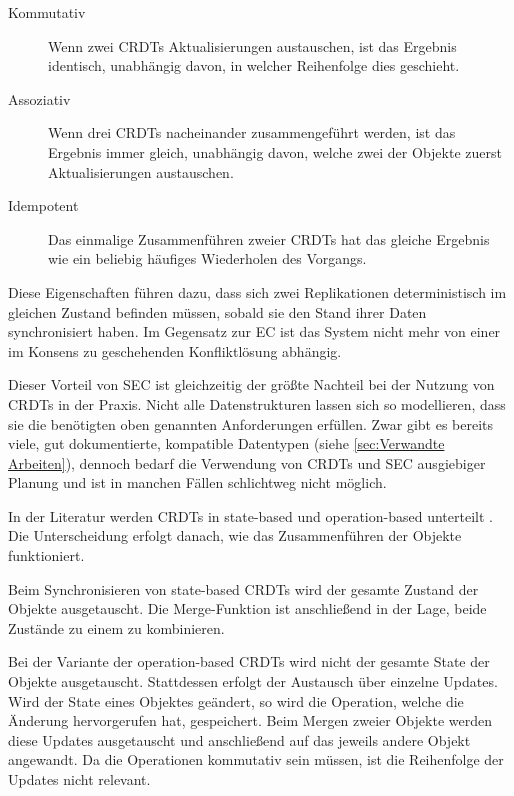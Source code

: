 \documentclass[a4paper, 12pt]{scrreprt}
\begin{document}
\begin{description}
	\item[Kommutativ] Wenn zwei CRDTs Aktualisierungen austauschen, ist das Ergebnis identisch, unabhängig davon, in welcher Reihenfolge dies geschieht.%
	\item[Assoziativ] Wenn drei CRDTs nacheinander zusammengeführt werden, ist das Ergebnis immer gleich, unabhängig davon, welche zwei der Objekte zuerst Aktualisierungen austauschen.%
	\item[Idempotent] Das einmalige Zusammenführen zweier CRDTs hat das gleiche Ergebnis wie ein beliebig häufiges Wiederholen des Vorgangs.%
\end{description}

Diese Eigenschaften führen dazu, dass sich zwei Replikationen deterministisch im gleichen Zustand befinden müssen, sobald sie den Stand ihrer Daten synchronisiert haben. Im Gegensatz zur \ac{EC} ist das System nicht mehr von einer im Konsens zu geschehenden Konfliktlösung abhängig. 

Dieser Vorteil von \ac{SEC} ist gleichzeitig der größte Nachteil bei der Nutzung von CRDTs in der Praxis. Nicht alle Datenstrukturen lassen sich so modellieren, dass sie die benötigten oben genannten Anforderungen erfüllen. Zwar gibt es bereits viele, gut dokumentierte, kompatible Datentypen (siehe \ref{sec:Verwandte Arbeiten}), dennoch bedarf die Verwendung von CRDTs und \ac{SEC} ausgiebiger Planung und ist in manchen Fällen schlichtweg nicht möglich.

In der Literatur werden CRDTs in state-based und operation-based unterteilt \autocite[S. 10]{ArticleOptimisticReplication}. Die Unterscheidung erfolgt danach, wie das Zusammenführen der Objekte funktioniert.

\begin{description}
\label{sec:stateopbased}
	\item[State-based]
	Beim Synchronisieren von state-based CRDTs wird der gesamte Zustand der Objekte ausgetauscht.
	Die Merge-Funktion ist anschließend in der Lage, beide Zustände zu einem zu kombinieren. 
	
	\item[Operation-based]
	Bei der Variante der operation-based CRDTs wird nicht der gesamte State der Objekte ausgetauscht. Stattdessen erfolgt der Austausch über einzelne Updates. Wird der State eines Objektes geändert, so wird die Operation, welche die Änderung hervorgerufen hat, gespeichert. Beim Mergen zweier Objekte werden diese Updates ausgetauscht und anschließend auf das jeweils andere Objekt angewandt. Da die Operationen kommutativ sein müssen,
	ist die Reihenfolge der Updates nicht relevant. 
\end{description} 
\end{document}
